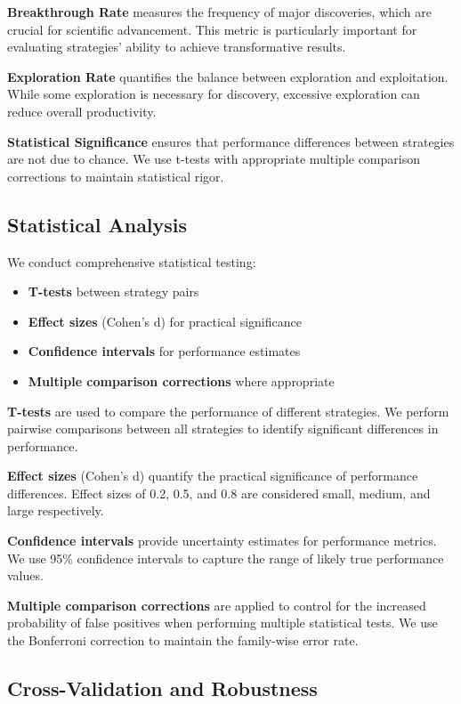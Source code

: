 \documentclass[letterpaper]{article} %
\begin{document}
\textbf{Breakthrough Rate} measures the frequency of major discoveries, which are crucial for scientific advancement. This metric is particularly important for evaluating strategies' ability to achieve transformative results.

\textbf{Exploration Rate} quantifies the balance between exploration and exploitation. While some exploration is necessary for discovery, excessive exploration can reduce overall productivity.

\textbf{Statistical Significance} ensures that performance differences between strategies are not due to chance. We use t-tests with appropriate multiple comparison corrections to maintain statistical rigor.

\subsection{Statistical Analysis}

We conduct comprehensive statistical testing:
\begin{itemize}
\item \textbf{T-tests} between strategy pairs
\item \textbf{Effect sizes} (Cohen's d) for practical significance
\item \textbf{Confidence intervals} for performance estimates
\item \textbf{Multiple comparison corrections} where appropriate
\end{itemize}

\textbf{T-tests} are used to compare the performance of different strategies. We perform pairwise comparisons between all strategies to identify significant differences in performance.

\textbf{Effect sizes} (Cohen's d) quantify the practical significance of performance differences. Effect sizes of 0.2, 0.5, and 0.8 are considered small, medium, and large respectively.

\textbf{Confidence intervals} provide uncertainty estimates for performance metrics. We use 95\% confidence intervals to capture the range of likely true performance values.

\textbf{Multiple comparison corrections} are applied to control for the increased probability of false positives when performing multiple statistical tests. We use the Bonferroni correction to maintain the family-wise error rate.

\subsection{Cross-Validation and Robustness}
\end{document}
